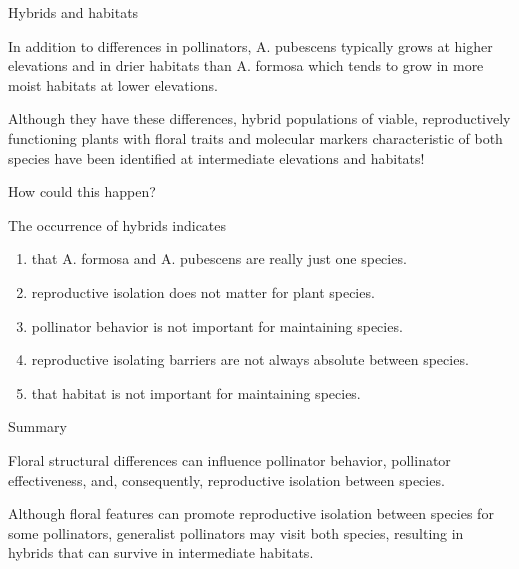 \documentclass[t]{beamer}
\newcommand{\ques}[1]{\highlight{\textsc{q#1:}}}
\begin{document}
%
\begin{frame}[t]{Hybrids and habitats}
	
	\hangpara In addition to differences in pollinators, A. pubescens typically grows at higher elevations and in drier habitats than A. formosa which tends to grow in more moist habitats at lower elevations.

	\hangpara Although they have these differences, hybrid populations of viable, reproductively functioning plants with floral traits and molecular markers characteristic of both species have been identified at intermediate elevations and habitats!

	\hangpara How could this happen? 

\end{frame}
%
\begin{frame}[t]{\ques{16} The occurrence of hybrids indicates}
	
	\begin{enumerate}
		\item that A. formosa and A. pubescens are really just one species.
		\item reproductive isolation does not matter for plant species.
		\item pollinator behavior is not important for maintaining species.
		\item reproductive isolating barriers are not always absolute between species.
		\item that habitat is not important for maintaining species.
	\end{enumerate}
\end{frame}
%
\begin{frame}[t]{Summary}
	
	\hangpara Floral structural differences can influence pollinator behavior, pollinator effectiveness, and, consequently, reproductive isolation between species. 

	\hangpara Although floral features can promote reproductive isolation between species for some pollinators, generalist pollinators may visit both species, resulting in hybrids that can survive in intermediate habitats. 
\end{frame}
%
\end{document}

